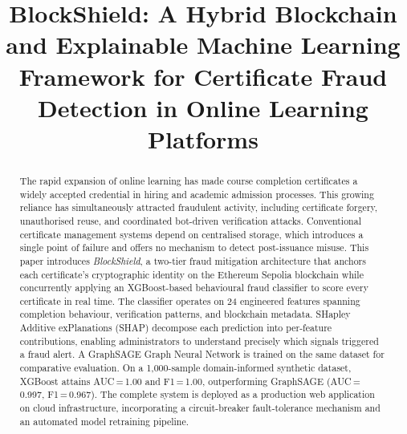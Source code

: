 \documentclass[conference]{IEEEtran}
\begin{document}
\title{BlockShield: A Hybrid Blockchain and Explainable Machine Learning
Framework for Certificate Fraud Detection in Online Learning Platforms}

\author{
\and
{}
}

\maketitle

\begin{abstract}
The rapid expansion of online learning has made course completion
certificates a widely accepted credential in hiring and academic
admission processes. This growing reliance has simultaneously
attracted fraudulent activity, including certificate forgery,
unauthorised reuse, and coordinated bot-driven verification attacks.
Conventional certificate management systems depend on centralised
storage, which introduces a single point of failure and offers no
mechanism to detect post-issuance misuse. This paper introduces
\textit{BlockShield}, a two-tier fraud mitigation architecture that
anchors each certificate's cryptographic identity on the Ethereum
Sepolia blockchain while concurrently applying an XGBoost-based
behavioural fraud classifier to score every certificate in real time.
The classifier operates on 24 engineered features spanning completion
behaviour, verification patterns, and blockchain metadata. SHapley
Additive exPlanations (SHAP) decompose each prediction into
per-feature contributions, enabling administrators to understand
precisely which signals triggered a fraud alert. A GraphSAGE Graph
Neural Network is trained on the same dataset for comparative
evaluation. On a 1,000-sample domain-informed synthetic dataset,
XGBoost attains AUC\,=\,1.00 and F1\,=\,1.00, outperforming
GraphSAGE (AUC\,=\,0.997, F1\,=\,0.967). The complete system is
deployed as a production web application on cloud infrastructure,
incorporating a circuit-breaker fault-tolerance mechanism and an
automated model retraining pipeline.
\end{abstract}
\end{document}
